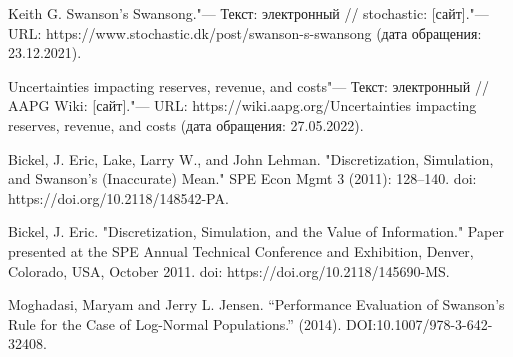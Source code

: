 \documentclass[12pt]{article}
\begin{document}
	\begin{thebibliography}{1}
		 Keith G. Swanson's Swansong."--- Текст: электронный // stochastic: [сайт]."--- URL: https://www.stochastic.dk/post/swanson-s-swansong (дата обращения: 23.12.2021).
		
		 Uncertainties impacting reserves, revenue, and costs"--- Текст: электронный // AAPG Wiki: [сайт]."--- URL: https://wiki.aapg.org/Uncertainties impacting reserves, revenue, and costs (дата обращения: 27.05.2022).
		
		 Bickel, J. Eric, Lake, Larry W., and John Lehman. "Discretization, Simulation, and Swanson's (Inaccurate) Mean." SPE Econ Mgmt 3 (2011): 128–140. doi: https://doi.org/10.2118/148542-PA.
		
		 Bickel, J. Eric. "Discretization, Simulation, and the Value of Information." Paper presented at the SPE Annual Technical Conference and Exhibition, Denver, Colorado, USA, October 2011. doi: https://doi.org/10.2118/145690-MS.
		
		 Moghadasi, Maryam and Jerry L. Jensen. “Performance Evaluation of Swanson’s Rule for the Case of Log-Normal Populations.” (2014). DOI:10.1007/978-3-642-32408.
		
		
	\end{thebibliography}
	
	
	
	
	
\end{document}

